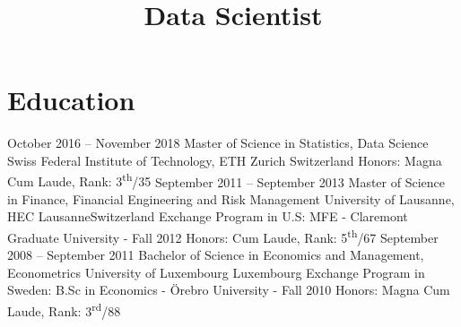\documentclass[11pt,a4paper,sans]{moderncv}
\title{Data Scientist}
\begin{document}
\makecvtitle %
\vspace*{-10mm}


\section{\LARGE{Education}}
\vspace{2mm}
\cventry
	{October 2016 -- November 2018}
	{Master of Science in Statistics, Data Science}
	{Swiss Federal Institute of Technology, ETH Zurich}
	{Switzerland}{}
	{Honors: Magna Cum Laude, Rank: 3\textsuperscript{th}/35} %
\vspace{2mm}
\cventry
	{September 2011 -- September 2013}
	{Master of Science in Finance, Financial Engineering and Risk Management}
	{University of Lausanne, HEC Lausanne}{Switzerland}{}
	{Exchange Program in U.S: MFE - Claremont Graduate University - Fall 2012
	\newline Honors: Cum Laude, Rank: {5\textsuperscript{th}/67}} %
\vspace{2mm}
\cventry
	{September 2008 -- September 2011}
	{Bachelor of Science in Economics and Management, Econometrics}
	{University of Luxembourg}
	{Luxembourg}{}
	{Exchange Program in Sweden: B.Sc in Economics - Örebro University - Fall 2010
	\newline  Honors: Magna Cum Laude, Rank: {3\textsuperscript{rd}/88}}  %
\end{document}
